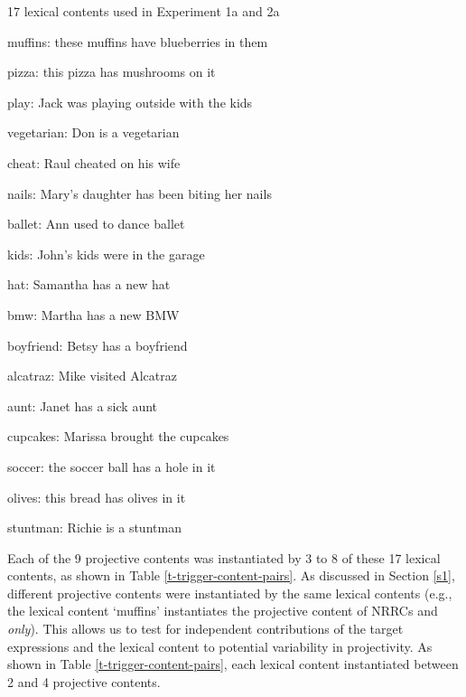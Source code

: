 \documentclass[11pt,fleqn]{article}
\newcommand{\6}{\mbox{$[\hspace*{-.6mm}[$}}
\newcommand{\9}{\mbox{$]\hspace*{-.6mm}]$}}
\newcommand{\tableref}[1]{Table \ref{#1}}
\newcommand{\sectionref}[1]{Section \ref{#1}}
\begin{document}
\begin{exe}
\ex\label{contents} 17 lexical contents used in Experiment 1a and 2a

\begin{enumerate}[itemsep=-.5mm]

\ex muffins: these muffins have blueberries in them

\ex pizza: this pizza has mushrooms on it

\ex play: Jack was playing outside with the kids

\ex vegetarian: Don is a vegetarian

\ex cheat: Raul cheated on his wife

\ex nails: Mary's daughter has been biting her nails

\ex ballet: Ann used to dance ballet

\ex kids: John's kids were in the garage

\ex hat: Samantha has a new hat

\ex bmw: Martha has a new BMW

\ex boyfriend: Betsy has a boyfriend

\ex alcatraz: Mike visited Alcatraz

\ex aunt: Janet has a sick aunt

\ex cupcakes: Marissa brought the cupcakes

\ex soccer: the soccer ball has a hole in it

\ex olives: this bread has olives in it

\ex stuntman: Richie is a stuntman

\end{enumerate}
\end{exe}

Each of the 9 projective contents was instantiated by 3 to 8 of these 17 lexical contents, as shown in \tableref{t-trigger-content-pairs}. As discussed in \sectionref{s1}, different projective contents were instantiated by the same lexical contents (e.g., the lexical content `muffins' instantiates the projective content of NRRCs and {\em only}). This allows us to test for independent contributions of the target expressions and the lexical content to potential variability in projectivity. As shown in \tableref{t-trigger-content-pairs}, each lexical content instantiated between 2 and 4 projective contents.
\end{document}
